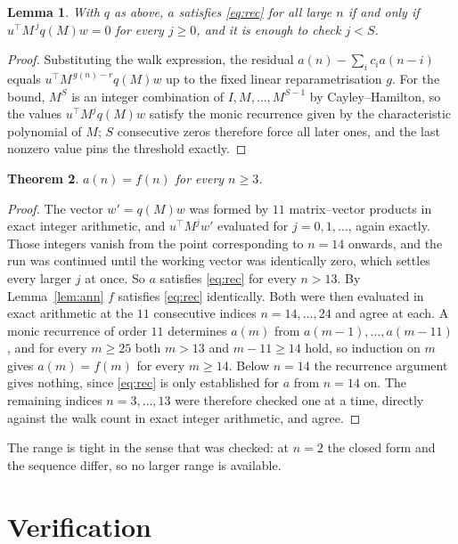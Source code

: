 \documentclass[11pt,a4paper]{article}
\theoremstyle{plain}
\newtheorem{theorem}{Theorem}
\newtheorem{lemma}[theorem]{Lemma}
\theoremstyle{definition}
\begin{document}
\begin{lemma}\label{lem:crit}
With $q$ as above, $a$ satisfies \eqref{eq:rec} for all large $n$ if and only if
$u^{\!\top}M^{\,j}q(M)w=0$ for every $j\ge0$, and it is enough to check $j<S$.
\end{lemma}

\begin{proof}
Substituting the walk expression, the residual $a(n)-\sum_ic_ia(n-i)$ equals
$u^{\!\top}M^{\,g(n)-r}q(M)w$ up to the fixed linear reparametrisation $g$. For the bound,
$M^{S}$ is an integer combination of $I,M,\dots,M^{S-1}$ by Cayley--Hamilton, so the values
$u^{\!\top}M^{j}q(M)w$ satisfy the monic recurrence given by the characteristic polynomial of
$M$; $S$ consecutive zeros therefore force all later ones, and the last nonzero value pins the
threshold exactly.
\end{proof}

\begin{theorem}
$a(n)=f(n)$ for every $n\ge3$.
\end{theorem}

\begin{proof}
The vector $w'=q(M)w$ was formed by $11$ matrix--vector products in exact integer
arithmetic, and $u^{\!\top}M^{j}w'$ evaluated for $j=0,1,\dots$, again exactly. Those integers
vanish from the point corresponding to $n=14$ onwards, and the run was continued until the
working vector was identically zero, which settles every larger $j$ at once. So $a$ satisfies
\eqref{eq:rec} for every $n>13$. By Lemma~\ref{lem:ann} $f$ satisfies \eqref{eq:rec}
identically. Both were then evaluated in exact arithmetic at the $11$ consecutive indices
$n=14,\dots,24$ and agree at each. A monic recurrence of order $11$
determines $a(m)$ from $a(m-1),\dots,a(m-11)$, and for every $m\ge25$ both
$m>13$ and $m-11\ge14$ hold, so induction on $m$ gives $a(m)=f(m)$ for every
$m\ge14$.
Below $n=14$ the recurrence argument gives nothing, since \eqref{eq:rec} is only
established for $a$ from $n=14$ on. The remaining indices $n=3,\dots,13$ were
therefore checked one at a time, directly against the walk count in exact integer arithmetic,
and agree.
\end{proof}

The range is tight in the sense that was checked: at $n=2$ the closed form and the sequence differ, so no larger range is available.

\section{Verification}
\end{document}
